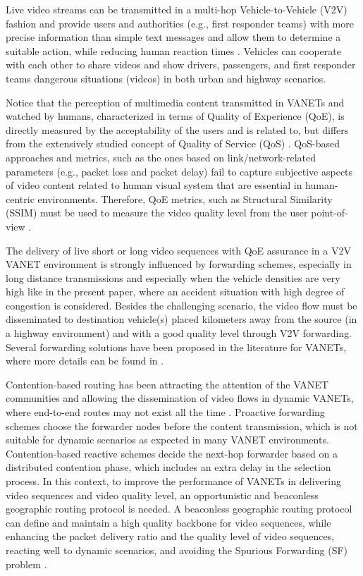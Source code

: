 \documentclass{sig-alternate-2013}
\begin{document}
Live video streams can be transmitted in a multi-hop Vehicle-to-Vehicle (V2V) fashion and provide users and authorities (e.g., first responder teams) with more precise information than simple text messages and allow them to determine a suitable action, while reducing human reaction times \cite{Vehicularcommunications:emergency}. Vehicles can cooperate with each other to share videos and show drivers, passengers, and first responder teams dangerous situations (videos) in both urban and highway scenarios.

Notice that the perception of multimedia content transmitted in VANETs and watched by humans, characterized in terms of Quality of Experience (QoE), is directly measured by the acceptability of the users and is related to, but differs from the extensively studied concept of Quality of Service (QoS) \cite{QualityEstimator}. QoS-based approaches and metrics, such as the ones based on link/network-related parameters  (e.g., packet loss and packet delay) fail to capture subjective aspects of video content related to human visual system that are essential in human-centric environments. Therefore, QoE metrics, such as Structural Similarity (SSIM) must be used to measure the video quality level from the user point-of-view \cite{QoEMu}.

The delivery of live short or long video sequences with QoE assurance in a V2V VANET environment is strongly influenced by forwarding schemes, especially in long distance transmissions and especially when the vehicle densities are very high like in the present paper, where an accident situation with high degree of congestion is considered. Besides the challenging scenario, the video flow must be disseminated to destination vehicle(s) placed kilometers away from the source (in a highway environment) and with a good quality level through V2V forwarding. Several forwarding solutions have been proposed in the literature for VANETs, where more details can be found in \cite{VehicularAdHocGerla}.

Contention-based routing has been attracting the attention of the VANET communities and allowing the dissemination of video flows in dynamic VANETs, where end-to-end routes may not exist all the time \cite{VideoBackboneDiFelice}. Proactive forwarding schemes choose the forwarder nodes before the content transmission, which is not suitable for dynamic scenarios as expected in many VANET environments. Contention-based reactive schemes decide the next-hop forwarder based on a distributed contention phase, which includes an extra delay in the selection process. In this context, to improve the performance of VANETs in delivering video sequences and video quality level, an opportunistic and beaconless geographic routing protocol is needed. A beaconless geographic routing protocol can define and maintain a high quality backbone for video sequences, while enhancing the packet delivery ratio and the quality level of video sequences, reacting well to dynamic scenarios, and avoiding the Spurious Forwarding (SF) problem \cite{VTCDeFelice}.
\end{document}
